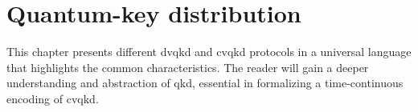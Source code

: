\chapter{Quantum-key distribution}

This chapter presents different \gls{dvqkd} and \gls{cvqkd} protocols in a universal language that highlights the common characteristics.
The reader will gain a deeper understanding and abstraction of \gls{qkd}, essential in formalizing a time-continuous encoding of \gls{cvqkd}.
